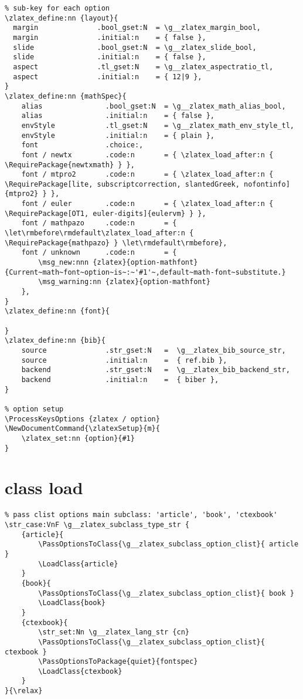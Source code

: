 \begin{verbatim}
% sub-key for each option
\zlatex_define:nn {layout}{
  margin              .bool_gset:N  = \g__zlatex_margin_bool,
  margin              .initial:n    = { false },
  slide               .bool_gset:N  = \g__zlatex_slide_bool,
  slide               .initial:n    = { false },
  aspect              .tl_gset:N    = \g__zlatex_aspectratio_tl,
  aspect              .initial:n    = { 12|9 },
}
\zlatex_define:nn {mathSpec}{
    alias               .bool_gset:N  = \g__zlatex_math_alias_bool,
    alias               .initial:n    = { false },
    envStyle            .tl_gset:N    = \g__zlatex_math_env_style_tl,
    envStyle            .initial:n    = { plain },
    font                .choice:,
    font / newtx        .code:n       = { \zlatex_load_after:n { \RequirePackage{newtxmath} } },
    font / mtpro2       .code:n       = { \zlatex_load_after:n { \RequirePackage[lite, subscriptcorrection, slantedGreek, nofontinfo]{mtpro2} } },
    font / euler        .code:n       = { \zlatex_load_after:n { \RequirePackage[OT1, euler-digits]{eulervm} } },
    font / mathpazo     .code:n       = { \let\rmbefore\rmdefault\zlatex_load_after:n { \RequirePackage{mathpazo} } \let\rmdefault\rmbefore},
    font / unknown      .code:n       = {
        \msg_new:nnn {zlatex}{option-mathfont}{Current~math~font~option~is~:~'#1'~,default~math-font~substitute.}
        \msg_warning:nn {zlatex}{option-mathfont}
    },
}
\zlatex_define:nn {font}{

}
\zlatex_define:nn {bib}{
    source              .str_gset:N   =  \g__zlatex_bib_source_str,
    source              .initial:n    =  { ref.bib },
    backend             .str_gset:N   =  \g__zlatex_bib_backend_str,
    backend             .initial:n    =  { biber },
}

% option setup
\ProcessKeysOptions {zlatex / option}
\NewDocumentCommand{\zlatexSetup}{m}{
    \zlatex_set:nn {option}{#1}
}
\end{verbatim}

\section{class load}
\begin{verbatim}
% pass clist options main subclass: 'article', 'book', 'ctexbook'
\str_case:VnF \g__zlatex_subclass_type_str {
    {article}{
        \PassOptionsToClass{\g__zlatex_subclass_option_clist}{ article }
        \LoadClass{article}
    }
    {book}{
        \PassOptionsToClass{\g__zlatex_subclass_option_clist}{ book }
        \LoadClass{book}   
    }
    {ctexbook}{
        \str_set:Nn \g__zlatex_lang_str {cn}
        \PassOptionsToClass{\g__zlatex_subclass_option_clist}{ ctexbook }
        \PassOptionsToPackage{quiet}{fontspec}
        \LoadClass{ctexbook}    
    }
}{\relax}
\end{verbatim}


